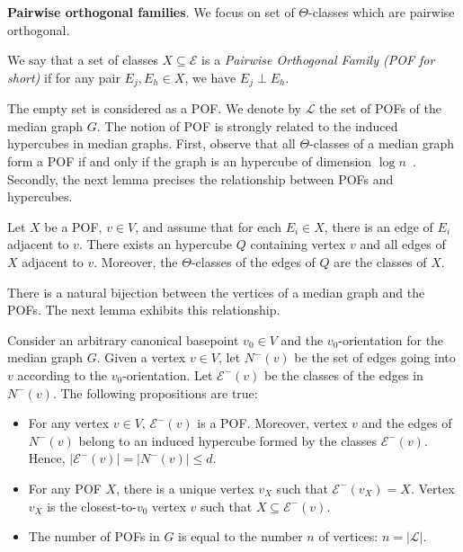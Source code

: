 \documentclass[a4paper,UKenglish,numberwithinsect,cleveref, autoref,anonymous]{lipics-v2021}
\newcommand{\card}[1]{\left| #1 \right|}
\begin{document}
\textbf{Pairwise orthogonal families}. We focus on set of $\Theta$-classes which are pairwise orthogonal.

\begin{definition}
We say that a set of classes $X \subseteq \mathcal{E}$ is a {\em Pairwise Orthogonal Family (POF for short)} if for any pair $E_j,E_h \in X$, we have $E_j \perp E_h$.
\end{definition}

The empty set is considered as a POF. We denote by $\mathcal{L}$ the set of POFs of the median graph $G$. The notion of POF is strongly related to the induced hypercubes in median graphs. First, observe that all $\Theta$-classes of a median graph form a POF if and only if the graph is an hypercube of dimension $\log n$~\cite{Ko09,MoMuRo98}. Secondly, the next lemma precises the relationship  between POFs and hypercubes.


\begin{lemma}
Let $X$ be a POF, $v \in V$, and assume that for each $E_i \in X$, there is an edge of $E_i$ adjacent to $v$. There exists an hypercube $Q$ containing vertex $v$ and all edges of $X$ adjacent to $v$. Moreover, the $\Theta$-classes of the edges of $Q$ are the classes of $X$.
\label{le:pof_adjacent}
\end{lemma}

There is a natural bijection between the vertices of a median graph and the POFs. The next lemma exhibits this relationship.

\begin{lemma}
Consider an arbitrary canonical basepoint $v_0 \in V$ and the $v_0$-orientation for the median graph $G$. Given a vertex $v \in V$, let $N^-(v)$ be the set of edges going into $v$ according to the $v_0$-orientation. Let $\mathcal{E}^-(v)$ be the classes of the edges in $N^-(v)$. The following propositions are true:
\begin{itemize}
\item For any vertex $v\in V$, $\mathcal{E}^-(v)$ is a POF. Moreover, vertex $v$ and the edges of $N^-(v)$ belong to an induced hypercube formed by the classes $\mathcal{E}^-(v)$. Hence, $\card{\mathcal{E}^-(v)} = \card{N^-(v)} \le d$.
\item For any POF $X$, there is a unique vertex $v_X$ such that $\mathcal{E}^-(v_X) = X$. Vertex $v_X$ is the closest-to-$v_0$ vertex $v$ such that $X \subseteq \mathcal{E}^-(v)$.
\item The number of POFs in $G$ is equal to the number $n$ of vertices: $n = \card{\mathcal{L}}$.
\end{itemize}
\label{le:pof_hypercube}
\end{lemma}
\end{document}

